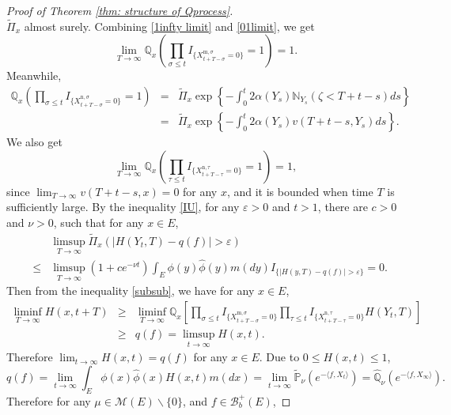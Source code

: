 \documentclass[12pt,a4paper]{amsart}
\theoremstyle{plain}
\theoremstyle{definition}
\numberwithin{equation}{section}
\begin{document}
\begin{proof}[Proof of Theorem \ref{thm: structure of Qprocess}]
\begin{equation}
\end{equation}
$\widetilde\Pi_x$ almost surely.  Combining \eqref{1infty limit} and \eqref{01limit}, we get
\[
\lim_{T\rightarrow\infty}\mathbb Q_{x}\left(\prod_{\sigma\leq t}I_{\{ X_{t+T-\sigma}^{{\mathrm m},\sigma}=0\}}=1\right)=1.
\]
Meanwhile,
\begin{eqnarray*}
\mathbb Q_x\left(\prod_{\sigma\leq t}I_{\{ X_{t+T-\sigma}^{{\mathrm n},\sigma}=0\}}=1\right)
&=&\widetilde\Pi_x\exp\left\{-\int_0^t2\alpha(Y_s)\mathbb N_{Y_s}(\zeta<T+t-s)ds\right\}\\
&=&\widetilde\Pi_x\exp\left\{-\int_0^t2\alpha(Y_s)v(T+t-s,Y_s)ds\right\}.
\end{eqnarray*}
We also get
\[
\lim_{T\rightarrow\infty}\mathbb Q_x\left(\prod_{\tau\leq t}I_{\{ X_{t+T-\tau}^{{\mathrm n},\tau}=0\}}=1\right)=1,
\]
since $\lim_{T\rightarrow\infty} v(T+t-s,x)=0$ for any $x$, and it is bounded when time $T$ is sufficiently large.  By the inequality \eqref{IU}, for any $\varepsilon>0$ and $t>1$, there are $c>0$ and $\nu>0$, such that for any $x\in E$,
\begin{eqnarray*}
&&\limsup_{T\rightarrow\infty}\widetilde\Pi_x\left(|H(Y_t, T)-q(f)|>\varepsilon\right)\\
&\leq& \limsup_{T\rightarrow\infty}(1+ce^{-\nu t})\int_E\phi(y)\hat\phi(y)m(dy)I_{\{|H(y, T)-q(f)|>\varepsilon\}}=0.
\end{eqnarray*}
Then from the inequality \eqref{subsub}, we have for any $x\in E$,
\begin{eqnarray*}
\liminf_{T\rightarrow\infty}H(x, t+T)&\geq&  \liminf_{T\rightarrow\infty} \mathbb Q_x\left[\prod_{\sigma\leq t}I_{\{ X_{t+T-\sigma}^{{\mathrm m},\sigma}=0\}}\prod_{\tau\leq t}I_{\{ X_{t+T-\tau}^{{\mathrm n},\tau}=0\}}H(Y_t, T)\right]\\
&\geq& q(f)=\limsup_{t\rightarrow\infty}H(x, t).
\end{eqnarray*}
 Therefore  $\lim_{t\rightarrow\infty}H(x, t)=q(f)$ for any $x\in E$.
Due to $0\leq H(x,t)\leq 1$,
\begin{equation*}
q(f)=\lim_{t\rightarrow\infty}\int_E\phi(x)\hat\phi(x)H(x,t)m(dx)
=\lim_{t\rightarrow\infty}\widetilde{\mathbb P}_{\nu}\left(e^{-\langle f, X_t\rangle }\right)
=\widehat{\mathbb Q}_{\nu}\left(e^{-\langle f, X_{\infty}\rangle }\right).
\end{equation*}
Therefore for any $\mu\in\mathcal M(E)\backslash\{0\}$, and $f\in\mathcal B_b^+(E)$,

\end{proof}
\end{document}
